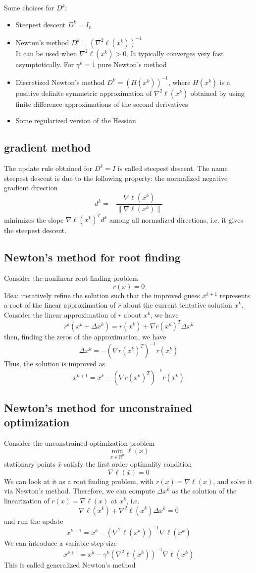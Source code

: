 \documentclass{book}
\newcommand{\R}{\mathbb{R}}
\begin{document}
Some choices for $D^k$:
\begin{itemize}
    \item Steepest descent $D^k=I_n$
    \item Newton's method $D^k = (\nabla^2\ell(x^k))^{-1}$\\
        It can be used when $\nabla^2\ell(x^k)>0$. It typically converges very fast asymptotically. For $\gamma^k = 1$ pure Newton's method
    \item Discretized Newton's method $D^k=(H(x^k))^{-1}$, where $H(x^k)$ is a positive definite symmetric approximation of $\nabla^2\ell(x^k)$ obtained by using finite difference approximations of the second derivatives 
    \item Some regularized version of the Hessian
\end{itemize}
\subsection{gradient method}
The update rule obtained for $D^k=I$ is called steepest descent. The name steepest descent is due to the following property: the normalized negative gradient direction 
\[
    d^k = -\displaystyle\frac{\nabla\ell(x^k)}{\|\nabla\ell(x^k)\|}
\]
minimizes the slope $\nabla \ell(x^k)^Td^k$ among all normalized directions, i.e. it gives the steepest descent.

\subsection{Newton's method for root finding}
Consider the nonlinear root finding problem 
\[
    r(x) = 0
\]
Idea: iteratively refine the solution such that the improved guess $x^{k+1}$ represents a root of the linear approximation of $r$ about the current tentative solution $x^k$. Consider the linear approximation of $r$ about $x^k$, we have 
\[
    r^k(x^k+\Delta x^k) = r(x^k)+\nabla r(x^k)^T\Delta x^k
\]
then, finding the zeros of the approximation, we have
\[
    \Delta x^k = -(\nabla r(x^k)^T)^{-1}r(x^k)
\]
Thus, the solution is improved as 
\[
    x^{k+1} = x^k-(\nabla r(x^k)^T)^{-1}r(x^k)
\]
\subsection{Newton's method for unconstrained optimization}
Consider the unconstrained optimization problem 
\[
    \min_{x\in\R^n} \ell(x)
\]
stationary points $\bar{x}$ satisfy the first order optimality condition 
\[
    \nabla \ell (\bar{x}) = 0
\]
We can look at it as a root finding problem, with $r(x)=\nabla\ell(x)$, and solve it via Newton's method. Therefore, we can compute $\Delta x^k$ as the solution of the linearization of $r(x)=\nabla\ell(x)$ at $x^k$, i.e. 
\[
    \nabla \ell(x^k) + \nabla^2\ell(x^k)\Delta x^k = 0
\]
and run the update 
\[
    x^{k+1} = x^k -(\nabla^2\ell(x^k))^{-1}\nabla\ell(x^k)
\]
We can introduce a variable step-size 
\[
    x^{k+1} = x^k-\gamma^k(\nabla^2\ell(x^k))^{-1}\nabla\ell(x^k)
\]
This is called generalized Newton's method
\end{document}

